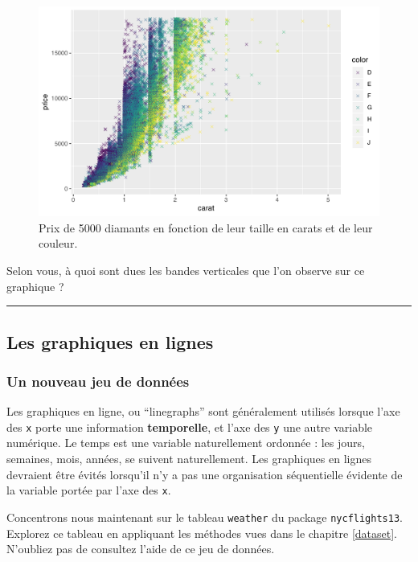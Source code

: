 \documentclass[a4paperpaper,]{article}
\theoremstyle{definition}
\theoremstyle{definition}
\theoremstyle{definition}
\theoremstyle{remark}
\begin{document}
\begin{figure}[htpb]

{\centering \includegraphics[width=0.9\linewidth]{figure/exodiamonds-1} 

}

\caption{Prix de 5000 diamants en fonction de leur taille en carats et de leur couleur.}\label{fig:exodiamonds}
\end{figure}

Selon vous, à quoi sont dues les bandes verticales que l'on observe sur
ce graphique ?

\begin{center}\rule{0.5\linewidth}{\linethickness}\end{center}

\subsection{Les graphiques en lignes}\label{les-graphiques-en-lignes}

\subsubsection{Un nouveau jeu de
données}\label{un-nouveau-jeu-de-donnees}

Les graphiques en ligne, ou ``linegraphs'' sont généralement utilisés
lorsque l'axe des \texttt{x} porte une information \textbf{temporelle},
et l'axe des \texttt{y} une autre variable numérique. Le temps est une
variable naturellement ordonnée : les jours, semaines, mois, années, se
suivent naturellement. Les graphiques en lignes devraient être évités
lorsqu'il n'y a pas une organisation séquentielle évidente de la
variable portée par l'axe des \texttt{x}.

Concentrons nous maintenant sur le tableau \texttt{weather} du package
\texttt{nycflights13}. Explorez ce tableau en appliquant les méthodes
vues dans le chapitre \ref{dataset}. N'oubliez pas de consultez l'aide
de ce jeu de données.
\end{document}
